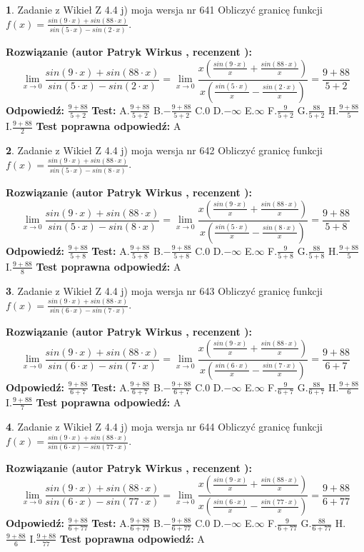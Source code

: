 \documentclass[12pt, a4paper]{article}
\theoremstyle{definition} %
\newtheorem{zad}{}
\newcommand{\zadStart}[1]{\begin{zad}#1\newline}
\newcommand{\zadStop}{\end{zad}}
\newcommand{\rozwStart}[2]{\noindent \textbf{Rozwiązanie (autor #1 , recenzent #2): }\newline}
\newcommand{\rozwStop}{\newline}
\newcommand{\odpStart}{\noindent \textbf{Odpowiedź:}\newline}
\newcommand{\odpStop}{\newline}
\newcommand{\testStart}{\noindent \textbf{Test:}\newline}
\newcommand{\testStop}{\newline}
\newcommand{\kluczStart}{\noindent \textbf{Test poprawna odpowiedź:}\newline}
\newcommand{\kluczStop}{\newline}
\begin{document}
\zadStart{Zadanie z Wikieł Z 4.4 j) moja wersja nr 641}
Obliczyć granicę funkcji $f(x)=\frac{sin(9\cdot x) +sin(88\cdot x)}{sin(5\cdot x) -sin(2\cdot x)}$.
\zadStop
\rozwStart{Patryk Wirkus}{}
$$\lim\limits_{x\to 0}\frac{sin(9\cdot x) +sin(88\cdot x)}{sin(5\cdot x) -sin(2\cdot x)}=\lim\limits_{x\to 0}\frac{x(\frac{sin(9\cdot x)}{x}+\frac{sin(88\cdot x)}{x})}{x(\frac{sin(5\cdot x)}{x}-\frac{sin(2\cdot x)}{x})}=\frac{9+88}{5+2}$$
\rozwStop
\odpStart
$\frac{9+88}{5+2}$
\odpStop
\testStart
A.$\frac{9+88}{5+2}$
B.$-\frac{9+88}{5+2}$
C.$0$
D.$-\infty$
E.$\infty$
F.$\frac{9}{5+2}$
G.$\frac{88}{5+2}$
H.$\frac{9+88}{5}$
I.$\frac{9+88}{2}$
\testStop
\kluczStart
A
\kluczStop



\zadStart{Zadanie z Wikieł Z 4.4 j) moja wersja nr 642}
Obliczyć granicę funkcji $f(x)=\frac{sin(9\cdot x) +sin(88\cdot x)}{sin(5\cdot x) -sin(8\cdot x)}$.
\zadStop
\rozwStart{Patryk Wirkus}{}
$$\lim\limits_{x\to 0}\frac{sin(9\cdot x) +sin(88\cdot x)}{sin(5\cdot x) -sin(8\cdot x)}=\lim\limits_{x\to 0}\frac{x(\frac{sin(9\cdot x)}{x}+\frac{sin(88\cdot x)}{x})}{x(\frac{sin(5\cdot x)}{x}-\frac{sin(8\cdot x)}{x})}=\frac{9+88}{5+8}$$
\rozwStop
\odpStart
$\frac{9+88}{5+8}$
\odpStop
\testStart
A.$\frac{9+88}{5+8}$
B.$-\frac{9+88}{5+8}$
C.$0$
D.$-\infty$
E.$\infty$
F.$\frac{9}{5+8}$
G.$\frac{88}{5+8}$
H.$\frac{9+88}{5}$
I.$\frac{9+88}{8}$
\testStop
\kluczStart
A
\kluczStop



\zadStart{Zadanie z Wikieł Z 4.4 j) moja wersja nr 643}
Obliczyć granicę funkcji $f(x)=\frac{sin(9\cdot x) +sin(88\cdot x)}{sin(6\cdot x) -sin(7\cdot x)}$.
\zadStop
\rozwStart{Patryk Wirkus}{}
$$\lim\limits_{x\to 0}\frac{sin(9\cdot x) +sin(88\cdot x)}{sin(6\cdot x) -sin(7\cdot x)}=\lim\limits_{x\to 0}\frac{x(\frac{sin(9\cdot x)}{x}+\frac{sin(88\cdot x)}{x})}{x(\frac{sin(6\cdot x)}{x}-\frac{sin(7\cdot x)}{x})}=\frac{9+88}{6+7}$$
\rozwStop
\odpStart
$\frac{9+88}{6+7}$
\odpStop
\testStart
A.$\frac{9+88}{6+7}$
B.$-\frac{9+88}{6+7}$
C.$0$
D.$-\infty$
E.$\infty$
F.$\frac{9}{6+7}$
G.$\frac{88}{6+7}$
H.$\frac{9+88}{6}$
I.$\frac{9+88}{7}$
\testStop
\kluczStart
A
\kluczStop



\zadStart{Zadanie z Wikieł Z 4.4 j) moja wersja nr 644}
Obliczyć granicę funkcji $f(x)=\frac{sin(9\cdot x) +sin(88\cdot x)}{sin(6\cdot x) -sin(77\cdot x)}$.
\zadStop
\rozwStart{Patryk Wirkus}{}
$$\lim\limits_{x\to 0}\frac{sin(9\cdot x) +sin(88\cdot x)}{sin(6\cdot x) -sin(77\cdot x)}=\lim\limits_{x\to 0}\frac{x(\frac{sin(9\cdot x)}{x}+\frac{sin(88\cdot x)}{x})}{x(\frac{sin(6\cdot x)}{x}-\frac{sin(77\cdot x)}{x})}=\frac{9+88}{6+77}$$
\rozwStop
\odpStart
$\frac{9+88}{6+77}$
\odpStop
\testStart
A.$\frac{9+88}{6+77}$
B.$-\frac{9+88}{6+77}$
C.$0$
D.$-\infty$
E.$\infty$
F.$\frac{9}{6+77}$
G.$\frac{88}{6+77}$
H.$\frac{9+88}{6}$
I.$\frac{9+88}{77}$
\testStop
\kluczStart
A
\kluczStop
\end{document}
